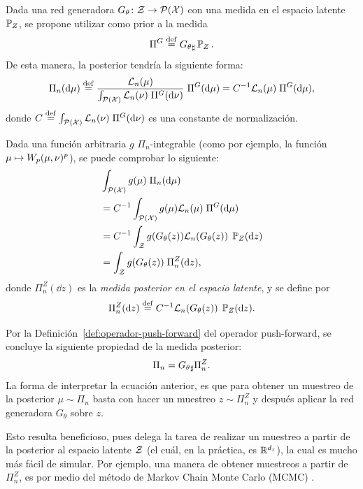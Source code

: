 Dada una red generadora $G_\theta \colon \cZ \to \ProbSpace[\cX] $ con una medida en el espacio latente $\Prob_Z$, se propone utilizar como prior a la medida
\begin{equation}
    \Pi^G \eqdef \pf{G_\theta} \Prob_Z.
\end{equation}
De esta manera, la posterior tendría la siguiente forma:
\begin{equation}
    \Pi_n(\dd \mu)
    \eqdef \frac{\cL_n(\mu)}{\int_{\ProbSpace[\cX]} \cL_n(\nu) \; \Pi^G(\dd \nu)} \; \Pi^G(\dd \mu)
    = C^{-1} \cL_n(\mu) \; \Pi^G(\dd \mu),
\end{equation}
donde $C \eqdef \int_{\ProbSpace[\cX]} \cL_n(\nu) \; \Pi^G(\dd \nu)$ es una constante de normalización.

Dada una función arbitraria $g$ $\Pi_n$-integrable (como por ejemplo, la función $\mu \mapsto \Wasserstein[p]{\mu}{\nu}^p$), se puede comprobar lo siguiente:
\begin{align}\label{eq:posterior-en-latente-deduccion}
     & \int_{\ProbSpace[\cX]} g(\mu) \; \Pi_n(\dd \mu)                         \\
     & = C^{-1} \int_{\ProbSpace[\cX]} g(\mu) \cL_n(\mu) \; \Pi^G(\dd \mu)     \\
     & = C^{-1} \int_{\cZ} g(G_\theta(z)) \cL_n(G_\theta(z)) \; \Prob_Z(\dd z) \\
     & = \int_{\cZ} g(G_\theta(z)) \; \Pi^Z_n(\dd z),
\end{align}
donde $\Pi^Z_n(\dd z)$ es la \textit{medida posterior en el espacio latente}, y se define por
\begin{equation}
    \Pi^Z_n(\dd z) \eqdef C^{-1} \cL_n(G_\theta(z)) \; \Prob_Z(\dd z).
\end{equation}

Por la Definición~\ref{def:operador-push-forward} del operador push-forward, se concluye la siguiente propiedad de la medida posterior:
\begin{equation}\label{eq:posterior-en-latente}
    \Pi_n = \pf{G_\theta} \Pi^Z_n.
\end{equation}
La forma de interpretar la ecuación anterior, es que para obtener un muestreo de la posterior $\mu\sim\Pi_n$ basta con hacer un muestreo $z\sim\Pi^Z_n$ y después aplicar la red generadora $G_\theta$ sobre $z$.

Esto resulta beneficioso, pues delega la tarea de realizar un muestreo a partir de la posterior al espacio latente $\cZ$ (el cuál, en la práctica, es $\R^{d_z}$), la cual es mucho más fácil de simular. Por ejemplo, una manera de obtener muestreos a partir de $\Pi^Z_n$, es por medio del método de Markov Chain Monte Carlo (MCMC) \cite{andrieu2003introduction,brooks2011handbook,goodman2010ensemble}.

